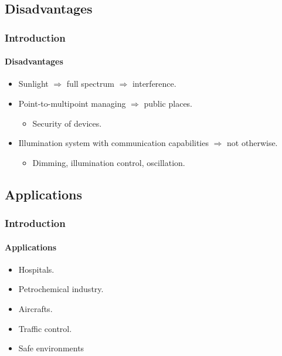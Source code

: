 \documentclass[mathserif]{beamer}
\newcommand{\wait}{\vfill}
\begin{document}
\subsection{Disadvantages}
\begin{frame}
\frametitle{Introduction}
\framesubtitle{Disadvantages}
	\begin{itemize}
		\item Sunlight $\Rightarrow$ full spectrum $\Rightarrow$ interference. \wait
		\item Point-to-multipoint managing $\Rightarrow$ public places.
		\begin{itemize}
			\item Security of devices. \wait
		\end{itemize}
		\item Illumination system with communication capabilities $\Rightarrow$ not otherwise.
		\begin{itemize}
			\item Dimming, illumination control, oscillation. \wait
		\end{itemize}
	\end{itemize}	
\end{frame}	

\subsection{Applications}
\begin{frame}
\frametitle{Introduction}
\framesubtitle{Applications}
	\begin{itemize}
		\item Hospitals. \wait
		\item Petrochemical industry. \wait
		\item Aircrafts. \wait
		\item Traffic control. \wait
		\item Safe environments \wait
	\end{itemize}
\end{frame}	

\end{document}

